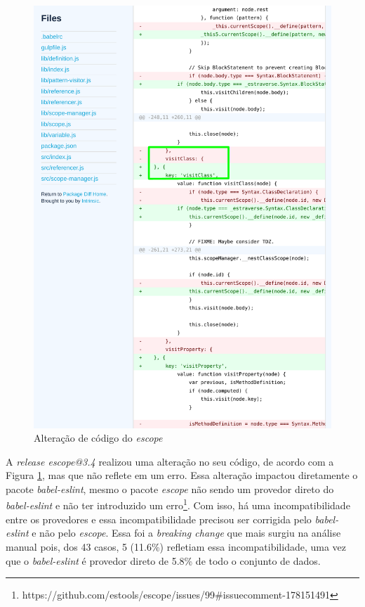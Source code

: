 \begin{itemize}
    \begin{figure}
        \centering
       \includegraphics[scale=0.7]{figuras/bc_category_incompatibles_providers.pdf}
        \caption{Alteração de código do \textit{escope}}
        \label{fig:bc_category_incompatibles_providers}
    \end{figure}{}

    A \textit{release escope@3.4} realizou uma alteração no seu código, de acordo com a Figura \ref{fig:bc_category_incompatibles_providers}, mas que não reflete em um erro. Essa alteração impactou diretamente o pacote \textit{babel-eslint}, mesmo o pacote \textit{escope} não sendo um provedor direto do \textit{babel-eslint} e não ter introduzido um erro\footnote{https://github.com/estools/escope/issues/99\#issuecomment-178151491}. Com isso, há uma incompatibilidade entre os provedores e essa incompatibilidade precisou ser corrigida pelo \textit{babel-eslint} e não pelo \textit{escope}. Essa foi a \textit{breaking change} que mais surgiu na análise manual pois, dos 43 casos, 5 (11.6\%) refletiam essa incompatibilidade, uma vez que o \textit{babel-eslint} é provedor direto de 5.8\% de todo o conjunto de dados.


\end{itemize}
